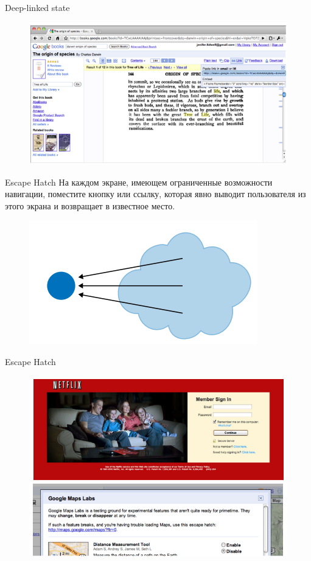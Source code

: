 \documentclass{beamer}
\begin{document}
\begin{frame}[t]{Deep-linked state}
	\begin{figure}[h]
		\centering
		\includegraphics[scale=0.5]{images/lec07-pic34.png}
	\end{figure}
\end{frame}

\begin{frame}[t]{Escape Hatch}
	На каждом экране, имеющем ограниченные возможности навигации, поместите кнопку или ссылку, которая явно выводит пользователя из этого экрана и возвращает в известное место. 
	\begin{figure}[h]
		\centering
		\includegraphics[scale=0.5]{images/lec07-pic35.png}
	\end{figure}
\end{frame}

\begin{frame}[t]{Escape Hatch}
	\begin{figure}[h]
		\centering
		\includegraphics[scale=0.5]{images/lec07-pic36.png}
	\end{figure}
\end{frame}	
\end{document}
